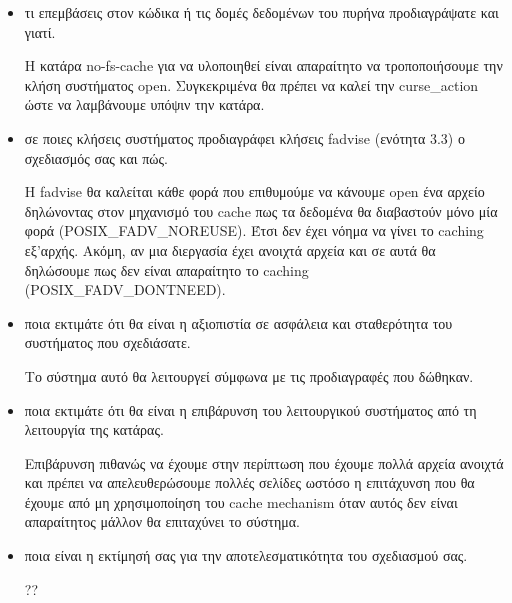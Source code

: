 \documentclass[a4paper,11pt]{article} \usepackage{anysize}
\begin{document}
\begin{itemize}

    \item τι επεμβάσεις στον κώδικα ή τις δομές δεδομένων του πυρήνα προδιαγράψατε και γιατί.

        Η κατάρα no-fs-cache για να υλοποιηθεί είναι απαραίτητο να
        τροποποιήσουμε την κλήση συστήματος open. Συγκεκριμένα θα πρέπει να
        καλεί την curse\_action ώστε να λαμβάνουμε υπόψιν την κατάρα.

    \item σε ποιες κλήσεις συστήματος προδιαγράφει κλήσεις fadvise (ενότητα 3.3) ο σχεδιασμός σας και πώς.

        Η fadvise θα καλείται κάθε φορά που επιθυμούμε να κάνουμε open ένα
        αρχείο δηλώνοντας στον μηχανισμό του cache πως τα δεδομένα θα
        διαβαστούν μόνο μία φορά (POSIX\_FADV\_NOREUSE). Έτσι δεν έχει νόημα να γίνει το caching
        εξ'αρχής. Ακόμη, αν μια διεργασία έχει ανοιχτά αρχεία και σε αυτά θα
        δηλώσουμε πως δεν είναι απαραίτητο το caching (POSIX\_FADV\_DONTNEED).

    \item ποια εκτιμάτε ότι θα είναι η αξιοπιστία σε ασφάλεια και σταθερότητα του συστήματος που σχεδιάσατε.

        Το σύστημα αυτό θα λειτουργεί σύμφωνα με τις προδιαγραφές που δώθηκαν.

    \item ποια εκτιμάτε ότι θα είναι η επιβάρυνση του λειτουργικού συστήματος από τη λειτουργία της κατάρας.

        Επιβάρυνση πιθανώς να έχουμε στην περίπτωση που έχουμε πολλά αρχεία
        ανοιχτά και πρέπει να απελευθερώσουμε πολλές σελίδες ωστόσο η
        επιτάχυνση που θα έχουμε από μη χρησιμοποίηση του cache mechanism όταν
        αυτός δεν είναι απαραίτητος μάλλον θα επιταχύνει το σύστημα.

    \item ποια είναι η εκτίμησή σας για την αποτελεσματικότητα του σχεδιασμού σας.

        ??

\end{itemize}
\end{document}
